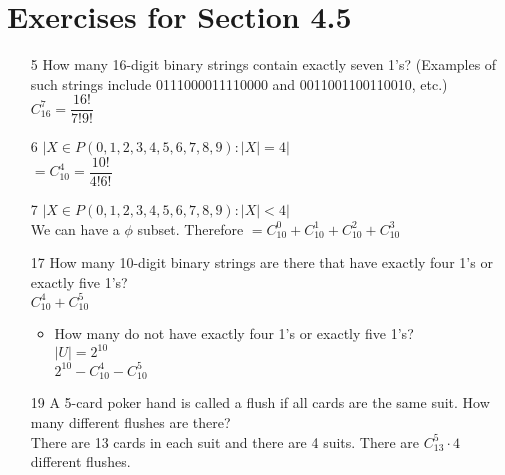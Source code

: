\documentclass[12pt]{article}
\begin{document}
\section*{Exercises for Section 4.5}
\begin{enumerate}
    \item [5] How many 16-digit binary strings contain exactly seven 1’s? (Examples of such
strings include 0111000011110000 and 0011001100110010, etc.)\\
	$C_{16}^7 = \dfrac{16!}{7!9!}$
    \item [6] $|{X \in P({0,1,2,3,4,5,6,7,8,9}): |X| = 4}|$\\
	$= C_{10}^4 = \dfrac{10!}{4!6!}$
    \item [7] $|{X \in P({0,1,2,3,4,5,6,7,8,9}): |X| < 4}|$\\
	We can have a $\phi$ subset. Therefore $= C_{10}^0 + C_{10}^1 + C_{10}^2 + C_{10}^3$
    \item [17] How many 10-digit binary strings are there that have exactly four 1’s or exactly
five 1’s?\\
	$C_{10}^4 + C_{10}^5$
	\begin{itemize}
	    \item How many do not have exactly four 1’s or exactly five 1’s?\\
		$|U| = 2^{10}$\\
		$2^{10} - C_{10}^4 - C_{10}^5$
	\end{itemize}
    \item [19] A 5-card poker hand is called a flush if all cards are the same suit. How many
different flushes are there?\\
	There are 13 cards in each suit and there are 4 suits. There are $C_{13}^5 \cdot 4$ different flushes.
\end{enumerate}
\end{document}
